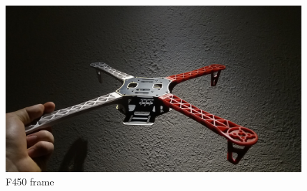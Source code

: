 \begin{figure}
\centering
\includegraphics[scale=0.1]{images/drone-build-frame.jpg}
\caption{F450 frame
}%
\label{fig:frame}
\end{figure}







